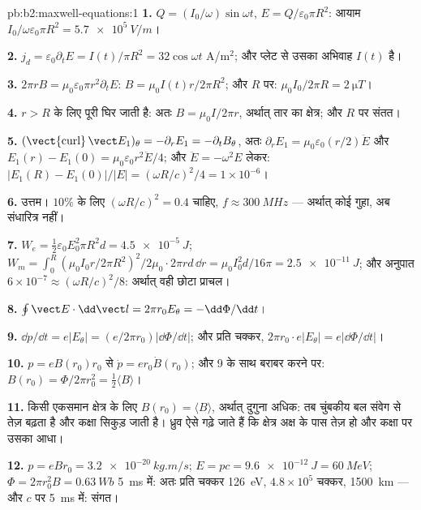 \begin{solution}{pb:b2:maxwell-equations:1}
\textbf{1.} $Q = (I_0/\omega)\sin\omega t$, $E = Q/\varepsilon_0\pi R^2$: आयाम $I_0/\omega\varepsilon_0
\pi R^2 = \qty{5.7e5}{V/m}$।

\textbf{2.} $j_d = \varepsilon_0\partial_tE = I(t)/\pi R^2 = 32\cos\omega t$ A/m$^2$; और प्लेट से
उसका अभिवाह $I(t)$ है।

\textbf{3.} $2\pi rB = \mu_0\varepsilon_0\pi r^2\partial_tE$: $B = \mu_0I(t)r/2\pi R^2$; और $R$ पर:
$\mu_0I_0/2\pi R = \qty{2}{\micro T}$।

\textbf{4.} $r > R$ के लिए पूरी  घिर जाती है: अतः $B =
\mu_0I/2\pi r$, अर्थात् तार का क्षेत्र; और $R$ पर संतत।

\textbf{5.} $(\operatorname{\vect{curl}}\vect E_1)_\theta = -\partial_rE_1 = -\partial_tB_\theta$, अतः $\partial_rE_1
= \mu_0\varepsilon_0(r/2)\ddot E$ और $E_1(r) - E_1(0) = \mu_0\varepsilon_0r^2\ddot E/4$; और
$\ddot E = -\omega^2E$ लेकर: $|E_1(R) - E_1(0)|/|E| = (\omega R/c)^2/4 = 1 \times 10^{-6}$।

\textbf{6.} उत्तम। $10\%$ के लिए $(\omega R/c)^2 = 0.4$ चाहिए, $f \approx \qty{300}{MHz}$ ---
अर्थात् कोई गुहा, अब संधारित्र नहीं।

\textbf{7.} $W_e = \tfrac12\varepsilon_0E_0^2\pi R^2d = \qty{4.5e-5}{J}$; $W_m = \int_0^R(\mu_0I_0r/
2\pi R^2)^2/2\mu_0\cdot2\pi rd\,\dd r = \mu_0I_0^2d/16\pi = \qty{2.5e-11}{J}$; और अनुपात $6 \times
10^{-7} \approx (\omega R/c)^2/8$: अर्थात् वही छोटा प्राचल।

\textbf{8.} $\oint\vect E\cdot\dd\vect l = 2\pi r_0E_\theta = -\dd\Phi/\dd t$।

\textbf{9.} $\dd p/\dd t = e|E_\theta| = (e/2\pi r_0)|\dd\Phi/\dd t|$; और प्रति चक्कर,
$2\pi r_0\cdot e|E_\theta| = e|\dd\Phi/\dd t|$।

\textbf{10.} $p = eB(r_0)r_0$ से $\dot p = er_0\dot B(r_0)$; और 9 के साथ बराबर करने पर:
$B(r_0) = \Phi/2\pi r_0^2 = \tfrac12\langle B\rangle$।

\textbf{11.} किसी एकसमान क्षेत्र के लिए $B(r_0) = \langle B\rangle$, अर्थात् दुगुना अधिक:
तब चुंबकीय बल संवेग से तेज़ बढ़ता है और कक्षा
सिकुड़ जाती है। ध्रुव ऐसे गढ़े जाते हैं कि क्षेत्र अक्ष के पास तेज़ हो
और कक्षा पर उसका आधा।

\textbf{12.} $p = eBr_0 = \qty{3.2e-20}{kg.m/s}$; $E = pc = \qty{9.6e-12}{J} = \qty{60}{MeV}$;
$\Phi = 2\pi r_0^2B = \qty{0.63}{Wb}$ \qty{5}{ms} में: अतः प्रति चक्कर \qty{126}{eV}, $4.8 \times
10^5$ चक्कर, \qty{1500}{km} --- और $c$ पर \qty{5}{ms} में: संगत।


\end{solution}
